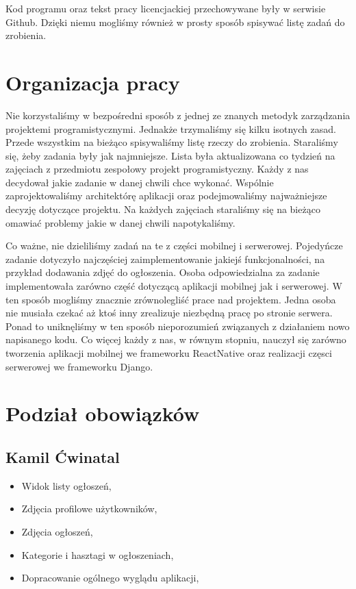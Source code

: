 \documentclass[licencjacka]{pracamgr}
\begin{document}
Kod programu oraz tekst pracy licencjackiej przechowywane były w serwisie Github. Dzięki niemu mogliśmy również w prosty sposób spisywać listę zadań do zrobienia.

\section{Organizacja pracy}

Nie korzystaliśmy w bezpośredni sposób z jednej ze znanych metodyk zarządzania projektemi programistycznymi. Jednakże trzymaliśmy się kilku isotnych zasad. Przede wszystkim na bieżąco spisywaliśmy listę rzeczy do zrobienia. Staraliśmy się, żeby zadania były jak najmniejsze. Lista była aktualizowana co tydzień na zajęciach z przedmiotu zespołowy projekt programistyczny. Każdy z nas decydował jakie zadanie w danej chwili chce wykonać. Wspólnie zaprojektowaliśmy architektórę aplikacji oraz podejmowaliśmy najważniejsze decyzję dotyczące projektu. Na każdych zajęciach staraliśmy się na bieżąco omawiać problemy jakie w danej chwili napotykaliśmy.

Co ważne, nie dzieliliśmy zadań na te z części mobilnej i serwerowej. Pojedyńcze zadanie dotyczyło najczęściej zaimplementowanie jakiejś funkcjonalności, na przykład dodawania zdjęć do ogłoszenia. Osoba odpowiedzialna za zadanie implementowała zarówno część dotyczącą aplikacji mobilnej jak i serwerowej. W ten sposób mogliśmy znacznie zrównolegliść prace nad projektem. Jedna osoba nie musiała czekać aż ktoś inny zrealizuje niezbędną pracę po stronie serwera. Ponad to uniknęliśmy w ten sposób nieporozumień związanych z działaniem nowo napisanego kodu. Co więcej każdy z nas, w równym stopniu, nauczył się zarówno tworzenia aplikacji mobilnej we frameworku ReactNative oraz realizacji częsci serwerowej we frameworku Django.

\section{Podział obowiązków}

\subsection{Kamil Ćwinatal}
\begin{itemize}
\setlength\itemsep{-0.2em}
    \item Widok listy ogłoszeń,
    \item Zdjęcia profilowe użytkowników,
    \item Zdjęcia ogłoszeń,
    \item Kategorie i hasztagi w ogłoszeniach,
    \item Dopracowanie ogólnego wyglądu aplikacji,
\end{itemize}{}
\end{document}
